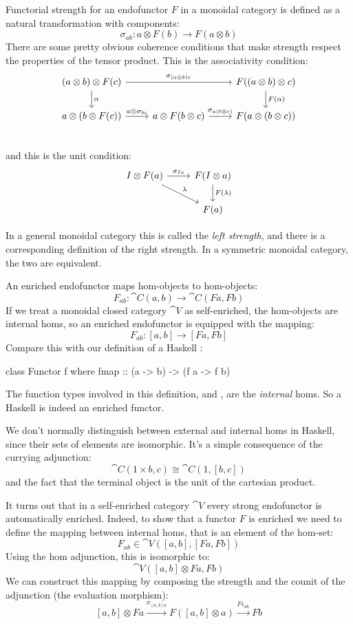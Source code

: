 \documentclass[DaoFP]{subfiles}
\begin{document}
Functorial strength for an endofunctor $F$ in a monoidal category is defined as a natural transformation with components:
\[ \sigma_{a b} \colon a \otimes F(b) \to F (a \otimes b) \]
There are some pretty obvious coherence conditions that make strength respect the properties of the tensor product. This is the associativity condition:
\[
 \begin{tikzcd}
 (a \otimes b) \otimes F (c) 
 \arrow[rr, "\sigma_{(a \otimes b) c}"]
 \arrow[d, "\alpha"]
 && F((a \otimes b) \otimes c)
 \arrow[d, "F(\alpha)"]
 \\
 a \otimes (b \otimes F(c))
 \arrow[r, "a \otimes \sigma_{b c}"]
 & a \otimes F(b \otimes c)
 \arrow[r, "\sigma_{a (b \otimes c)}"]
 & F(a \otimes (b \otimes c))
 \\
 \end{tikzcd}
\]
and this is the unit condition:
\[
 \begin{tikzcd}
 I \otimes F(a)
 \arrow[r, "\sigma_{I a}"]
 \arrow[rd, "\lambda"]
 & F(I \otimes a)
 \arrow[d, "F (\lambda)"]
 \\
 & F(a)
 \end{tikzcd}
\]

In a general monoidal category this is called the \emph{left strength}, and there is a corresponding definition of the right strength. In a symmetric monoidal category, the two are equivalent.

An enriched endofunctor maps hom-objects to hom-objects:
\[ F_{a b} \colon \cat C (a, b) \to \cat C (F a, F b) \]
If we treat a monoidal closed category $\cat V$ as self-enriched, the hom-objects are internal homs, so an enriched endofunctor is equipped with the mapping:
\[ F_{a b} \colon [a, b] \to [F a, F b] \]
Compare this with our definition of a Haskell :
\begin{haskell}
class Functor f where
  fmap :: (a -> b) -> (f a -> f b)
\end{haskell}
The function types involved in this definition,  and , are the \emph{internal} homs. So a Haskell  is indeed an enriched functor. 

We don't normally distinguish between external and internal homs in Haskell, since their sets of elements are isomorphic. It's a simple consequence of the currying adjunction:
\[ \cat C(1 \times b, c) \cong \cat C(1, [b, c]) \]
and the fact that the terminal object is the unit of the cartesian product.

It turns out that in a self-enriched category $\cat V$ every strong endofunctor is automatically enriched. Indeed, to show that a functor $F$ is enriched we need to define the mapping between internal homs, that is an element of the hom-set:
\[ F_{a b} \in \cat V([a, b], [F a, F b]) \]
Using the hom adjunction, this is isomorphic to:
\[ \cat V([a, b] \otimes F a, F b) \]
We can construct this mapping by composing the strength and the counit of the adjunction (the evaluation morphism):
\[ [a, b] \otimes F a \xrightarrow{\sigma_{[a, b] a}} F ([a, b] \otimes a) \xrightarrow{F \epsilon_{a b}} F b \]
\end{document}
